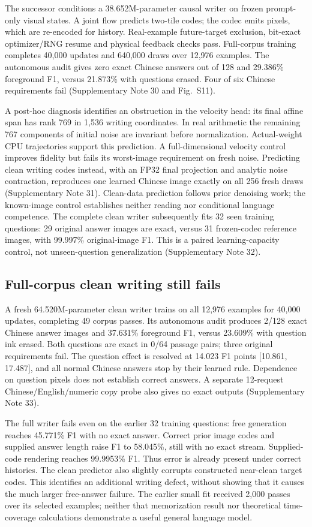 The successor conditions a 38.652M-parameter causal writer on
frozen prompt-only visual states. A joint flow predicts two-tile codes;
the codec emits pixels, which are re-encoded for history. Real-example
future-target exclusion, bit-exact optimizer/RNG resume and physical feedback
checks pass. Full-corpus training completes 40,000 updates and 640,000 draws
over 12,976 examples. The autonomous audit gives zero exact Chinese answers
out of 128 and 29.386\% foreground F1, versus 21.873\% with questions erased.
Four of six Chinese requirements fail (Supplementary Note 30 and Fig.~S11).

A post-hoc diagnosis identifies an obstruction in the velocity head:
its final affine span has rank 769 in 1,536 writing coordinates. In real
arithmetic the remaining 767 components of initial noise are invariant
before normalization. Actual-weight CPU trajectories support this prediction.
A full-dimensional velocity control improves fidelity but fails its worst-image
requirement on fresh noise. Predicting clean writing codes instead, with an
FP32 final projection and analytic noise contraction, reproduces one learned
Chinese image exactly on all 256 fresh draws (Supplementary Note 31).
Clean-data prediction follows prior denoising work\cite{jit}; the known-image
control establishes neither reading nor conditional language competence.
The complete clean writer subsequently fits 32 seen training questions:
29 original answer images are exact, versus 31 frozen-codec reference images,
with 99.997\% original-image F1. This is a paired learning-capacity control,
not unseen-question generalization (Supplementary Note 32).

\subsection*{Full-corpus clean writing still fails}
A fresh 64.520M-parameter clean writer trains on all 12,976 examples for
40,000 updates, completing 49 corpus passes. Its autonomous audit produces
2/128 exact Chinese answer images and 37.631\% foreground F1, versus
23.609\% with question ink erased. Both questions are exact in 0/64 passage
pairs; three original requirements fail. The question effect is resolved
at 14.023 F1 points [10.861, 17.487], and all normal Chinese answers stop
by their learned rule. Dependence on question pixels does not establish
correct answers. A separate 12-request Chinese/English/numeric copy probe
also gives no exact outputs (Supplementary Note 33).

The full writer fails even on the earlier 32 training questions: free
generation reaches 45.771\% F1 with no exact answer. Correct prior image
codes and supplied answer length raise F1 to 58.045\%, still with no exact
stream. Supplied-code rendering reaches 99.9953\% F1. Thus error is already
present under correct histories. The clean predictor also slightly corrupts
constructed near-clean target codes. This identifies an additional writing
defect, without showing that it causes the much larger free-answer failure.
The earlier small fit received 2,000 passes over its selected examples;
neither that memorization result nor theoretical time-coverage calculations
demonstrate a useful general language model.

